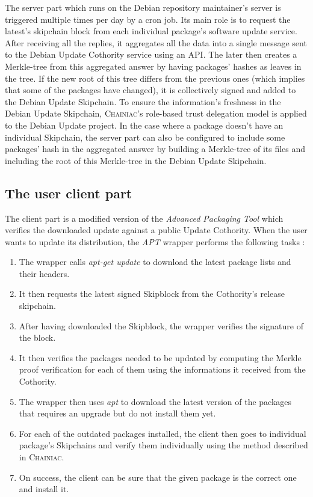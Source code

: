 \documentclass[11pt, upma4paper, twoside, openany, parskip=half]{book}
\begin{document}
The server part which runs on the Debian repository maintainer's server is triggered multiple times per day by a cron job. Its main role is to request the latest's skipchain block from each individual package's software update service. After receiving all the replies, it aggregates all the data into a single message sent to the Debian Update Cothority service using an API. The later then creates a Merkle-tree from this aggregated answer by having packages' hashes as leaves in the tree. If the new root of this tree differs from the previous ones (which implies that some of the packages have changed), it is collectively signed and added to the Debian Update Skipchain. To ensure the information's freshness in the Debian Update Skipchain, \textsc{Chainiac}'s role-based trust delegation model is applied to the Debian Update project. In the case where a package doesn't have an individual Skipchain, the server part can also be configured to include some packages' hash in the aggregated answer by building a Merkle-tree of its files and including the root of this Merkle-tree in the Debian Update Skipchain.

\subsection{The user client part}
The client part is a modified version of the \emph{Advanced Packaging Tool} which verifies the downloaded update against a public Update Cothority. When the user wants to update its distribution, the \emph{APT} wrapper performs the following tasks :

\begin{enumerate}[noitemsep]
\item The wrapper calls \emph{apt-get update} to download the latest package lists and their headers.
\item It then requests the latest signed Skipblock from the Cothority's release skipchain.
\item After having downloaded the Skipblock, the wrapper verifies the signature of the block.
\item It then verifies the packages needed to be updated by computing the Merkle proof verification for each of them using the informations it received from the Cothority.
\item The wrapper then uses \emph{apt} to download the latest version of the packages that requires an upgrade but do not install them yet.
\item For each of the outdated packages installed, the client then goes to individual package's Skipchains and verify them individually using the method described in \textsc{Chainiac}.
\item On success, the client can be sure that the given package is the correct one and install it.
\end{enumerate}
\end{document}
